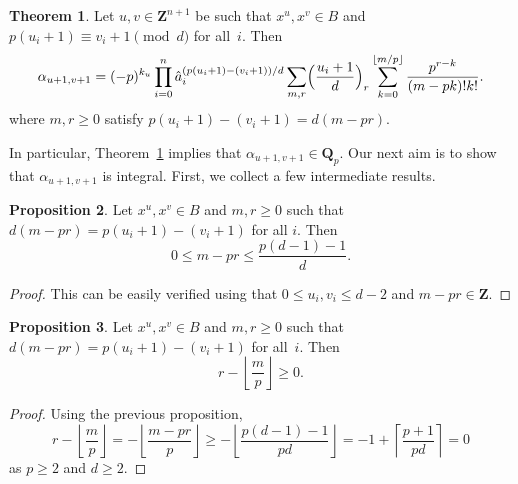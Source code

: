\documentclass[a4paper,11pt]{article}
\numberwithin{equation}{section}
\providecommand{\floor}[1]{\left\lfloor#1\right\rfloor}   %
\providecommand{\ceil}[1]{\left\lceil#1\right\rceil}   %
\newcommand{\ZZ}{\mathbf{Z}} %
\newcommand{\QQ}{\mathbf{Q}} %
\theoremstyle{definition}
\newtheorem{thm}{Theorem}[section]
\newtheorem{prop}[thm]{Proposition}
\begin{document}
\begin{thm} \label{thm:alpha}
Let $u, v \in \ZZ^{n+1}$ be such that 
$x^u, x^v \in B$ and 
$p (u_i + 1) \equiv v_i + 1 \pmod{d}$ for all~$i$. 
Then 
\begin{equation}
\alpha_{u+1,v+1} = (-p)^{k_u} \prod_{i=0}^n 
    \hat{a}_i^{(p (u_i + 1) - (v_i + 1))/d} \sum_{m,r} 
    \Bigl(\frac{u_i+1}{d}\Bigr)_r 
    \sum_{k=0}^{\floor{m/p}} \frac{p^{r-k}}{(m-pk)! k!}.
\end{equation}
where $m, r \geq 0$ satisfy $p (u_i + 1) - (v_i + 1) = d (m - pr)$.
\hfill \qedsymbol
\end{thm}

In particular, Theorem~\ref{thm:alpha} implies that 
$\alpha_{u+1, v+1} \in \QQ_p$.  Our next aim is to show
that $\alpha_{u+1,v+1}$ is integral.  First, we collect a few 
intermediate results.

\begin{prop} \label{prop:mpr1}
Let $x^u, x^v \in B$ and 
$m, r \geq 0$ such that $d(m-pr) = p(u_i + 1) - (v_i + 1)$ for all $i$.  Then 
\begin{equation}
0 \leq m - p r \leq \frac{p(d-1)-1}{d}.
\end{equation}

\end{prop}

\begin{proof}
This can be easily verified using that $0 \leq u_i, v_i \leq d - 2$ 
and $m - pr \in \ZZ$.
\end{proof}

\begin{prop} \label{prop:mpr2}
Let $x^u, x^v \in B$ and $m, r \geq 0$ such that 
$d(m-pr) = p(u_i + 1) - (v_i + 1)$ for all~$i$.  Then 
\begin{equation}
r - \floor{\frac{m}{p}} \geq 0.
\end{equation}
\end{prop}

\begin{proof}
Using the previous proposition,
\begin{equation}
r - \floor{\frac{m}{p}} 
= - \floor{\frac{m-pr}{p}} 
\geq - \floor{\frac{p(d-1)-1}{pd}} 
= -1 + \ceil{\frac{p + 1}{pd}} 
= 0 
\end{equation}
as $p \geq 2$ and $d \geq 2$.
\end{proof}
\end{document}
